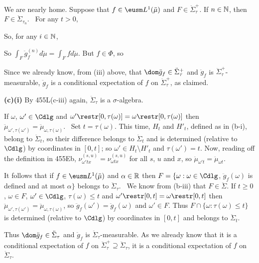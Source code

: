 { We are nearly home.   Suppose that
$f\in\eusm L^1(\ddot\mu)$ and $F\in\ddot\Sigma^+_{\tau}$.   If $n\in\Bbb N$,
then $F\in\ddot\Sigma_{\tau_n}$.   \Prf\ For any $t>0$,


\noindent So, for any $i\in\Bbb N$,


\noindent So $\int_F\ddot g^{(n)}_fd\ddot\mu=\int_Ffd\ddot\mu$.
But $f\in\Phi$, so


\noindent Since we already know, from (iii) above,
that $\dom\ddot g_f\in\ddot\Sigma^+_{\tau}$ and
$\ddot g_f$ is $\ddot\Sigma^+_{\tau}$-measurable, 
$\ddot g_f$ is a conditional expectation
of $f$ on $\ddot\Sigma^+_{\tau}$, as claimed.

\medskip

{\bf (c)(i)} By 455L(c-iii) again,
$\ddot\Sigma_{\tau}$ is a $\sigma$-algebra.

\medskip

 If $\omega$, $\omega'\in\Cdlg$ and
$\omega'\restr[0,\tau(\omega)]=\omega\restr[0,\tau(\omega)]$ then
$\ddot\mu_{\omega',\tau(\omega')}=\ddot\mu_{\omega,\tau(\omega)}$.   \Prf\
Set $t=\tau(\omega)$.   This time, $H_t$ and $H'_t$, defined as in
(b-i), belong to $\ddot\Sigma_t$, so their difference belongs to
$\ddot\Sigma_t$ and
is determined (relative to $\Cdlg$) by coordinates in $[0,t]$;  so
$\omega'\in H_t\setminus H'_t$ and $\tau(\omega')=t$.  Now, reading off the
definition in 455Eb, $\nu^{(s,u)}_{\omega'tx}=\nu^{(s,u)}_{\omega tx}$ for
all $s$, $u$ and $x$, so $\ddot\mu_{\omega't}=\ddot\mu_{\omega t}$.\ \Qed

\medskip

 It follows that if $f\in\eusm L^1(\ddot\mu)$
and $\alpha\in\Bbb R$ then
$F=\{\omega:\omega\in\Cdlg$, $\ddot g_f(\omega)$ is defined and at most
$\alpha\}$ belongs to $\ddot\Sigma_{\tau}$.
\Prf\ We know from (b-iii) that $F\in\ddot\Sigma$.   If $t\ge 0$,
$\omega\in F$, $\omega'\in\Cdlg$,
$\tau(\omega)\le t$ and $\omega'\restr[0,t]=\omega\restr[0,t]$ then
$\ddot\mu_{\omega',\tau(\omega')}=\ddot\mu_{\omega,\tau(\omega)}$, so
$\ddot g_f(\omega')=\ddot g_f(\omega)$ and $\omega'\in F$.   Thus
$F\cap\{\omega:\tau(\omega)\le t\}$ is determined (relative to $\Cdlg$)
by coordinates in $[0,t]$
and belongs to $\ddot\Sigma_t$.\ \Qed

\medskip

 Thus $\dom\ddot g_f\in\ddot\Sigma_{\tau}$ and $\ddot g_f$ is
$\ddot\Sigma_{\tau}$-measurable.   As we already know that it is a
conditional
expectation of $f$ on $\ddot\Sigma_{\tau}^+\supseteq\ddot\Sigma_{\tau}$, it is a
conditional expectation of $f$ on $\ddot\Sigma_{\tau}$.
}%

